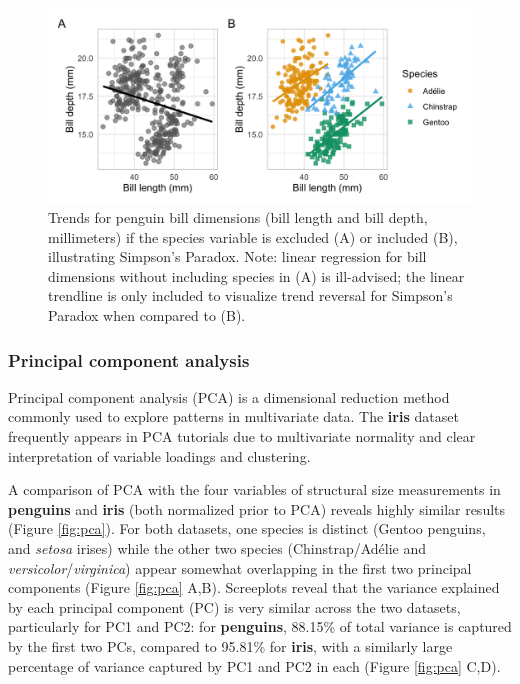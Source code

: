 \begin{Schunk}
\begin{figure}[htbp]

{\centering \includegraphics[width=\textwidth]{figs/simpsons-1} 

}

\caption[Trends for penguin bill dimensions (bill length and bill depth, millimeters) if the species variable is excluded (A) or included (B), illustrating Simpson’s Paradox]{Trends for penguin bill dimensions (bill length and bill depth, millimeters) if the species variable is excluded (A) or included (B), illustrating Simpson’s Paradox. Note: linear regression for bill dimensions without including species in (A) is ill-advised; the linear trendline is only included to visualize trend reversal for Simpson’s Paradox when compared to (B).}\label{fig:simpsons}
\end{figure}
\end{Schunk}

\hypertarget{principal-component-analysis}{%
\subsubsection{Principal component
analysis}\label{principal-component-analysis}}

Principal component analysis (PCA) is a dimensional reduction method
commonly used to explore patterns in multivariate data. The
\textbf{iris} dataset frequently appears in PCA tutorials due to
multivariate normality and clear interpretation of variable loadings and
clustering.

A comparison of PCA with the four variables of structural size
measurements in \textbf{penguins} and \textbf{iris} (both normalized
prior to PCA) reveals highly similar results (Figure \ref{fig:pca}). For
both datasets, one species is distinct (Gentoo penguins, and
\emph{setosa} irises) while the other two species (Chinstrap/Adélie and
\emph{versicolor}/\emph{virginica}) appear somewhat overlapping in the
first two principal components (Figure \ref{fig:pca} A,B). Screeplots
reveal that the variance explained by each principal component (PC) is
very similar across the two datasets, particularly for PC1 and PC2: for
\textbf{penguins}, 88.15\% of total variance is captured by the first
two PCs, compared to 95.81\% for \textbf{iris}, with a similarly large
percentage of variance captured by PC1 and PC2 in each (Figure
\ref{fig:pca} C,D).

